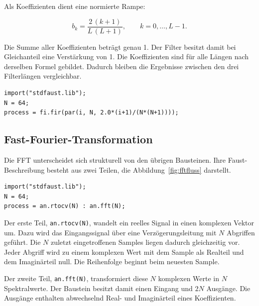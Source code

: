 Als Koeffizienten dient eine normierte Rampe:

\begin{equation}
b_k = \frac{2\,(k+1)}{L\,(L+1)}, \qquad k = 0, \dots, L-1 .
\end{equation}

Die Summe aller Koeffizienten beträgt genau 1. Der Filter besitzt damit bei
Gleichanteil eine Verstärkung von 1. Die Koeffizienten sind für alle Längen
nach derselben Formel gebildet. Dadurch bleiben die Ergebnisse zwischen den
drei Filterlängen vergleichbar.

\begin{program}
\caption{Faust-Beschreibung des FIR-Filters (hier mit $L = 64$)}
\label{prog:fir}
\begin{lstlisting}
import("stdfaust.lib");
N = 64;
process = fi.fir(par(i, N, 2.0*(i+1)/(N*(N+1))));
\end{lstlisting}
\end{program}


\subsection{Fast-Fourier-Transformation}
\label{subsec:fft}

Die FFT unterscheidet sich strukturell von den übrigen Bausteinen. Ihre
Faust-Beschreibung besteht aus zwei Teilen, die
Abbildung~\ref{fig:fftfluss} darstellt.

\begin{program}
\caption{Faust-Beschreibung der FFT (hier mit $N = 64$)}
\label{prog:fft}
\begin{lstlisting}
import("stdfaust.lib");
N = 64;
process = an.rtocv(N) : an.fft(N);
\end{lstlisting}
\end{program}

Der erste Teil, \texttt{an.rtocv(N)}, wandelt ein reelles Signal in einen
komplexen Vektor um. Dazu wird das Eingangssignal über eine
Verzögerungsleitung mit $N$ Abgriffen geführt. Die $N$ zuletzt eingetroffenen
Samples liegen dadurch gleichzeitig vor. Jeder Abgriff wird zu einem
komplexen Wert mit dem Sample als Realteil und dem Imaginärteil null. Die
Reihenfolge beginnt beim neuesten Sample.

Der zweite Teil, \texttt{an.fft(N)}, transformiert diese $N$ komplexen Werte
in $N$ Spektralwerte. Der Baustein besitzt damit einen Eingang und $2N$
Ausgänge. Die Ausgänge enthalten abwechselnd Real- und Imaginärteil eines
Koeffizienten.


